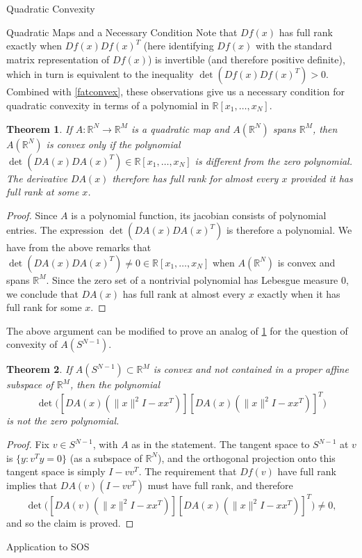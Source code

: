\documentclass[12pt,oneside,final]{ucthesisucsbmath2010}
\newcommand{\R}{\mathbb{R}}
\newtheorem{thm}{Theorem}[section]
\theoremstyle{definition}
\begin{document}
\begin{chapter}{Quadratic Convexity}
\begin{section}{Quadratic Maps and a Necessary Condition}
Note that $Df(x)$ has full rank exactly when $Df(x)Df(x)^T$ (here identifying $Df(x)$ with the standard matrix representation of $Df(x)$)  is invertible (and therefore positive definite), which in turn is equivalent to the inequality $\det (Df(x)Df(x)^T) > 0$. Combined with \ref{fatconvex}, these observations give us a necessary condition for quadratic convexity in terms of a polynomial in $\R[x_1,\ldots,x_N]$.

\begin{thm}If $A:\R^N \to \R^M$ is a quadratic map and $A(\R^N)$ spans $\R^M$, then $A(\R^N)$ is convex only if the polynomial $\det (DA(x)DA(x)^T) \in \R[x_1,\ldots,x_N]$ is different from the zero polynomial. The derivative $DA(x)$ therefore has full rank for almost every $x$ provided it has full rank at some $x$.
\label{ConPoly}
\end{thm}
\begin{proof}Since $A$ is a polynomial function, its jacobian consists of polynomial entries. The expression $\det (DA(x)DA(x)^T)$ is therefore a polynomial. We have from the above remarks that $\det(DA(x)DA(x)^T) \neq 0 \in \R[x_1,\ldots,x_N]$ when $A(\R^N)$ is convex and spans $\R^M$. Since the zero set of a nontrivial polynomial has Lebesgue measure $0$, we conclude that $DA(x)$ has full rank at almost every $x$ exactly when it has full rank for some $x$.\end{proof}

The above argument can be modified to prove an analog of \ref{ConPoly} for the question of convexity of $A(S^{N-1})$.
\begin{thm}
If $A(S^{N-1})\subset \R^M$ is convex and not contained in a proper affine subspace of $\R^M$, then the polynomial 
\[\det \Big([DA(x)(\|x\|^2I-xx^T)][DA(x)(\|x\|^2I-xx^T)]^T\Big) \] 
is not the zero polynomial.
\label{ConPolyCompact}
\end{thm}

\begin{proof}Fix $v\in S^{N-1}$, with $A$ as in the statement. The tangent space to $S^{N-1}$ at $v$ is $\{y : v^Ty=0\}$ (as a subspace of $\R^N$), and the orthogonal projection onto this tangent space is simply $I-vv^T$. The requirement that $Df(v)$ have full rank implies that $DA(v) (I-vv^T)$ must have full rank, and therefore
\[\det \Big([DA(v)(\|x\|^2I-xx^T)][DA(x)(\|x\|^2I-xx^T)]^T\Big)\neq0, \]
and so the claim is proved.
\end{proof}
\end{section}

\begin{section}{Application to SOS}


\end{section}
\end{chapter}
\end{document}
